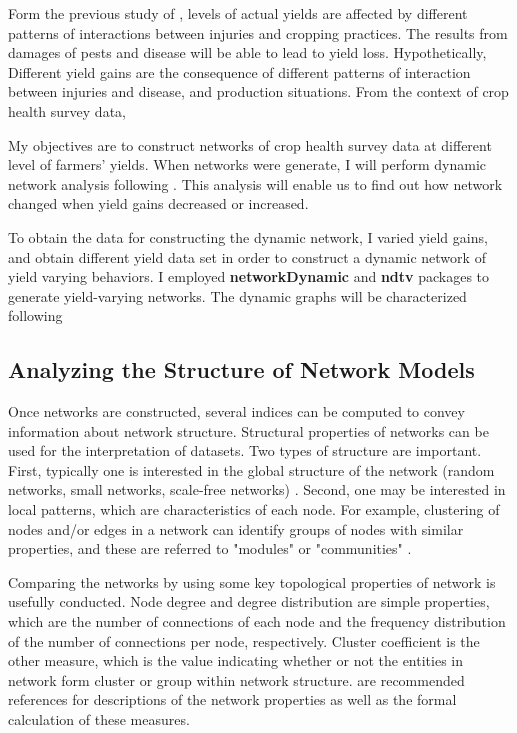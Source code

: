 Form the previous study of , levels of actual yields are affected by different patterns of interactions between injuries and cropping practices. The results from damages of pests and disease will be able to lead to yield loss. Hypothetically, Different yield gains are the consequence of different patterns of interaction between injuries and disease, and production situations.  From the context of crop health survey data, 

My objectives are to construct networks of crop health survey data at different level of farmers' yields. When networks were generate, I will perform dynamic network analysis following . This analysis will enable us to find out how network changed when yield gains decreased or increased.

To obtain the data for constructing the dynamic network, I varied yield gains, and obtain different yield data set in order to construct a dynamic network of yield varying behaviors. I employed \textbf{networkDynamic}  and \textbf{ndtv}  packages to generate yield-varying networks. The dynamic graphs will be characterized following 

\subsection*{Analyzing the Structure of Network Models}

Once networks are constructed, several indices can be computed to convey information about network structure. Structural properties of networks can be used for the interpretation of datasets. Two types of structure are important. First, typically one is interested in the global structure of the network (random networks, small networks, scale-free networks) . Second, one may be interested in local patterns, which are characteristics of each node. For example, clustering of nodes and/or edges in a network can identify groups of nodes with similar properties, and these are referred to "modules" or "communities" .

Comparing the networks by using some key topological properties of network is usefully conducted. Node degree and degree distribution are simple properties, which are the number of connections of each node and the frequency distribution of the number of connections per node, respectively. Cluster coefficient is the other measure, which is the value indicating whether or not the entities in network form cluster or group within network structure.  are recommended references for descriptions of the network properties as well as the formal calculation of these measures.


